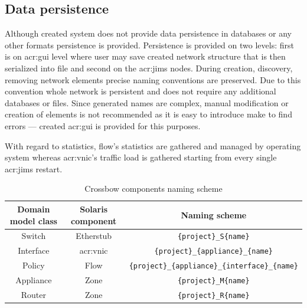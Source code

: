 \documentclass[11pt,openany]{book}
\begin{document}
		
      \subsection{Data persistence}
      \label{sec:impl:persist}

        Although created system does not provide data persistence in databases or any other formats  persistence is
        provided. Persistence is provided on two levels: first is on \gls{acr:gui} level where user may save created
        network structure that is then serialized into file and second on the \gls{acr:jims} nodes. During
        creation, discovery, removing network elements precise naming conventions are preserved. Due to this convention
        whole network is persistent and does not require any additional databases or files. Since generated names are
        complex, manual modification or creation of elements is not recommended as it is easy to introduce make to find
        errors --- created \gls{acr:gui} is provided for this purposes.

        With regard to statistics, flow's statistics are gathered and managed by operating system whereas \gls{acr:vnic}'s
        traffic load is gathered starting from every single \gls{acr:jims} restart.

        \begin{table}[H]
          \centering

          \begin{tabular}{|c|c|c|}
            \hline
            Domain model class & Solaris component & Naming scheme                                                \\
            \hline \hline
            Switch             & Etherstub         & \texttt{\{project\}\_S\{name\}}                              \\
            \hline
            Interface          & \gls{acr:vnic}    & \texttt{\{project\}\_\{appliance\}\_\{name\}}                \\
            \hline
            Policy             & Flow              & \texttt{\{project\}\_\{appliance\}\_\{interface\}\_\{name\}} \\
            \hline
            Appliance          & Zone              & \texttt{\{project\}\_M\{name\}}                              \\
            \hline
            Router             & Zone              & \texttt{\{project\}\_R\{name\}}                              \\
            \hline
          \end{tabular}

          \caption{Crossbow components naming scheme}
          \label{tab:impl:naming}
        \end{table}
		
\end{document}
